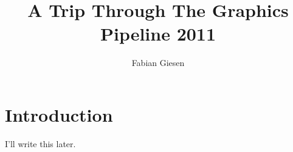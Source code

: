 \documentclass[DIV10]{scrreprt}
\begin{document}


\title{A Trip Through The Graphics Pipeline 2011}
\author{Fabian Giesen}
\maketitle
\tableofcontents

\chapter{Introduction}
I'll write this later.


\end{document}
